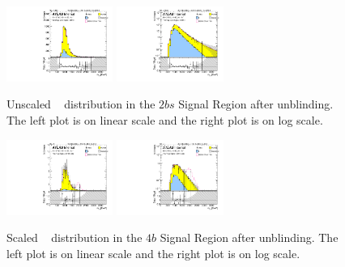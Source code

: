 \begin{figure}[htbp!]
\begin{center}
\includegraphics[width=0.31\textwidth,angle=-90]{figures/boosted/Signal_Syst/Moriond_bkg_9_TwoTag_split_Signal_mHH_l.pdf}
\includegraphics[width=0.31\textwidth,angle=-90]{figures/boosted/Signal_Syst/Moriond_bkg_9_TwoTag_split_Signal_mHH_l_1.pdf}  
  \caption{Unscaled \mtwoJ~ distribution in the $2bs$ Signal Region after unblinding. The left plot is on linear scale and the right plot is on log scale.}
  \label{fig:boosted-2b-signal-l}
\end{center}
\end{figure}

\begin{figure}[htbp!]
\begin{center}
\includegraphics[width=0.31\textwidth,angle=-90]{figures/boosted/Signal_Syst/Moriond_bkg_9_FourTag_Signal_mHH_pole.pdf}
\includegraphics[width=0.31\textwidth,angle=-90]{figures/boosted/Signal_Syst/Moriond_bkg_9_FourTag_Signal_mHH_pole_1.pdf}
  \caption{Scaled \mtwoJ~ distribution in the $4b$ Signal Region after unblinding. The left plot is on linear scale and the right plot is on log scale.}
  \label{fig:boosted-4b-signal-pole}
\end{center}
\end{figure}


